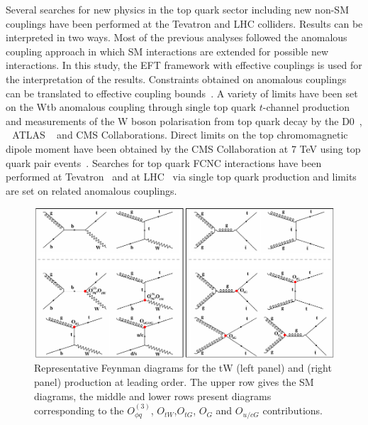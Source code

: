 Several searches for new physics in the top quark sector including new non-SM couplings have been performed at the Tevatron and LHC colliders.
Results can be interpreted in two ways. Most of the previous analyses followed the anomalous coupling approach in which SM interactions
are extended for possible new interactions. In this study, the EFT framework with effective couplings is used for the interpretation of the results.
Constraints obtained on anomalous couplings can be translated to effective coupling bounds~\cite{Zhang:2010dr,Abazov:2012uga}.
A variety of limits have been set on the Wtb anomalous coupling through single top quark $t$-channel production
and measurements of the W boson polarisation from top quark decay by the D0~\cite{Abazov:2012uga},
$\, \,$  ATLAS \cite{Aaboud:2017aqp,Aaboud:2016hsq} $\, \, \,$ and CMS \cite{Khachatryan:2016sib,Khachatryan:2014vma} Collaborations.
Direct limits on the top chromomagnetic dipole moment have been obtained  by the CMS Collaboration at 7 TeV using top quark pair events~\cite{CMS:2014bea}.
Searches for top quark FCNC interactions have been performed at Tevatron~\cite{Abazov:2010qk,Aaltonen:2008qr} and at LHC~\cite{Khachatryan:2016sib,Aad:2015gea}
via single top quark production and limits are set on related anomalous couplings.

\begin{figure}[t]
\centering\includegraphics[width=1\textwidth]{figures/tW/fig/fey}
\caption{Representative Feynman diagrams for the tW (left panel) and \ttbar (right panel) production at leading order. The upper row gives the SM diagrams, the middle and lower rows  present diagrams corresponding to the $O_{\phi q}^{(3)}$, $O_{tW}$,$O_{tG}$, $O_{G}$ and $O_{u/cG}$ contributions.}\label{fig-feyn}
\end{figure}

